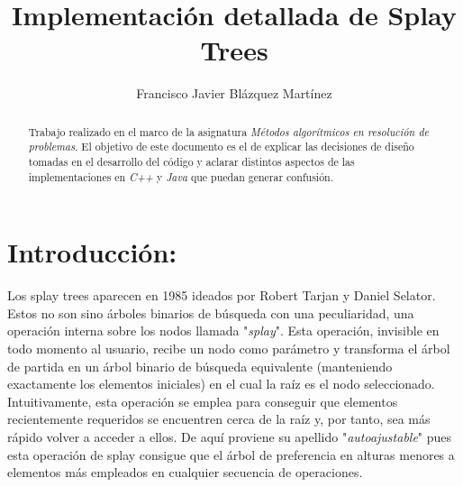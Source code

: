 \documentclass[letterpaper,12pt]{article}
\begin{document}
\title{\bf{Implementación detallada de Splay Trees}}
\author{Francisco Javier Blázquez Martínez}
\date{}
\maketitle

\begin{abstract}

Trabajo realizado en el marco de la asignatura \textit{Métodos algorítmicos 
en resolución de problemas}. El objetivo de este documento es el de explicar
las decisiones de diseño tomadas en el desarrollo del código y aclarar 
distintos aspectos de las implementaciones en \textit{C++} y \textit{Java} 
que puedan generar confusión.

\end{abstract}

\section{Introducción:}

Los splay trees aparecen en 1985 ideados por Robert Tarjan y Daniel Selator.
Estos no son sino árboles binarios de búsqueda con una peculiaridad, una 
operación interna sobre los nodos llamada "\textit{splay}". Esta operación, 
invisible en todo momento al usuario, recibe un nodo como parámetro y 
transforma el árbol de partida en un árbol binario de búsqueda equivalente 
(manteniendo exactamente los elementos iniciales) en el cual la raíz es el 
nodo seleccionado. Intuitivamente, esta operación se emplea para conseguir 
que elementos recientemente requeridos se encuentren cerca de la raíz y, por 
tanto, sea más rápido volver a acceder a ellos. De aquí proviene su apellido 
"\textit{autoajustable}" pues esta operación de splay consigue que el árbol 
de preferencia en alturas menores a elementos más empleados en cualquier 
secuencia de operaciones.
\end{document}
